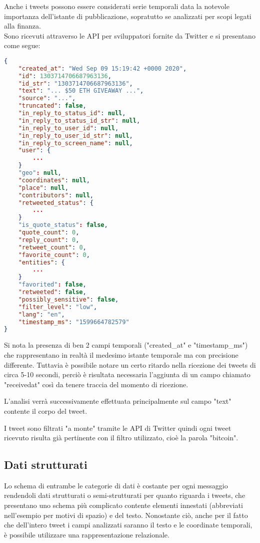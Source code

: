 Anche i tweets possono essere considerati serie temporali data la notevole importanza
dell'istante di pubblicazione, sopratutto se analizzati per scopi legati alla finanza.
\\
Sono ricevuti attraverso le API per sviluppatori fornite da Twitter \cite{twitter} e si
presentano come segue:

\begin{lstlisting}[language=json,firstnumber=1]
{
    "created_at": "Wed Sep 09 15:19:42 +0000 2020",
    "id": 1303714706687963136,
    "id_str": "1303714706687963136",
    "text": "... $50 ETH GIVEAWAY ...",
    "source": "...",
    "truncated": false,
    "in_reply_to_status_id": null,
    "in_reply_to_status_id_str": null,
    "in_reply_to_user_id": null,
    "in_reply_to_user_id_str": null,
    "in_reply_to_screen_name": null,
    "user": {
        ...
    }
    "geo": null,
    "coordinates": null,
    "place": null,
    "contributors": null,
    "retweeted_status": {
        ...
    }
    "is_quote_status": false,
    "quote_count": 0,
    "reply_count": 0,
    "retweet_count": 0,
    "favorite_count": 0,
    "entities": {
        ...
    }
    "favorited": false,
    "retweeted": false,
    "possibly_sensitive": false,
    "filter_level": "low",
    "lang": "en",
    "timestamp_ms": "1599664782579"
}
\end{lstlisting}
%
Si nota la presenza di ben 2 campi temporali ("created\_at" e "timestamp\_ms") che
rappresentano in realtà il medesimo istante temporale ma con precisione differente.
Tuttavia è possibile notare un certo ritardo nella ricezione dei tweets di circa 5-10
secondi, perciò è risultata necessaria l'aggiunta di un campo chiamato "receivedat" così
da tenere traccia del momento di ricezione.

L'analisi verrà successivamente effettuata principalmente sul campo "text" contente il
corpo del tweet.

I tweet sono filtrati "a monte" tramite le API di Twitter quindi ogni tweet ricevuto risulta già
pertinente con il filtro utilizzato, cioè la parola "bitcoin".

\subsection{Dati strutturati}

Lo schema di entrambe le categorie di dati è costante per ogni messaggio rendendoli dati
strutturati o semi-strutturati per quanto riguarda i tweets, che presentano uno schema più complicato
contente elementi innestati (abbreviati nell'esempio per motivi di spazio) e del testo.
Nonostante ciò, anche per il fatto che dell'intero tweet i campi analizzati saranno il testo
e le coordinate temporali, è possibile utilizzare una rappresentazione relazionale.